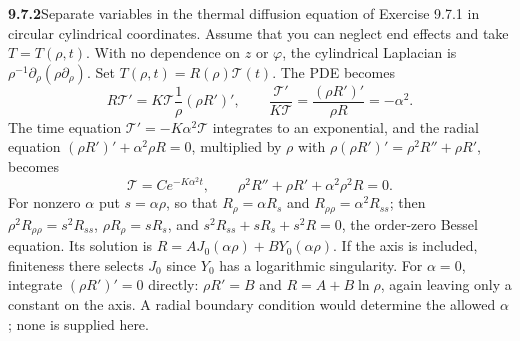 \par\bigskip
\noindent\textbf{9.7.2}\quad Separate variables in the thermal diffusion
equation of Exercise 9.7.1 in circular cylindrical coordinates. Assume that
you can neglect end effects and take $T=T(\rho,t)$.
\solution
With no dependence on $z$ or $\varphi$, the cylindrical Laplacian is
$\rho^{-1}\partial_\rho(\rho\partial_\rho)$.
Set $T(\rho,t)=R(\rho)\mathcal T(t)$.  The PDE becomes
\[
R\mathcal T'=K\mathcal T\frac1\rho(\rho R')',
\qquad
\frac{\mathcal T'}{K\mathcal T}
=\frac{(\rho R')'}{\rho R}=-\alpha^2.
\]
The time equation $\mathcal T'=-K\alpha^2\mathcal T$ integrates to an
exponential, and the radial equation $(\rho R')'+\alpha^2\rho R=0$,
multiplied by $\rho$ with $\rho(\rho R')'=\rho^2R''+\rho R'$, becomes
\[
\boxed{\mathcal T=C e^{-K\alpha^2t},\qquad
\rho^2R''+\rho R'+\alpha^2\rho^2R=0}.
\]
For nonzero $\alpha$ put $s=\alpha\rho$, so that $R_\rho=\alpha R_s$ and
$R_{\rho\rho}=\alpha^2R_{ss}$; then $\rho^2R_{\rho\rho}=s^2R_{ss}$,
$\rho R_\rho=sR_s$, and
$s^2R_{ss}+sR_s+s^2R=0$, the order-zero Bessel equation.
Its solution is $R=A J_0(\alpha\rho)+B Y_0(\alpha\rho)$.
If the axis is included, finiteness there selects $J_0$ since $Y_0$
has a logarithmic singularity.  For $\alpha=0$, integrate
$(\rho R')'=0$ directly: $\rho R'=B$ and
$R=A+B\ln\rho$, again leaving only a constant on the axis.
A radial boundary condition would determine the allowed $\alpha$;
none is supplied here.



